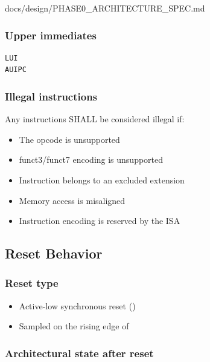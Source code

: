 \begin{relocated}{docs/design/PHASE0_ARCHITECTURE_SPEC.md}
\subsubsection{Upper immediates}\label{ds:ch:phase0-architecture:upper-immediates}

\begin{lstlisting}[language={}]
LUI
AUIPC
\end{lstlisting}

\subsubsection{Illegal instructions}\label{ds:ch:phase0-architecture:illegal-instructions}

Any instructions SHALL be considered illegal if:

\begin{itemize}
\tightlist
\item
  The opcode is unsupported
\item
  funct3/\allowbreak{}funct7 encoding is unsupported
\item
  Instruction belongs to an excluded extension
\item
  Memory access is misaligned
\item
  Instruction encoding is reserved by the ISA
\end{itemize}

\subsection{Reset Behavior}\label{ds:ch:phase0-architecture:reset-behavior}

\subsubsection{Reset type}\label{ds:ch:phase0-architecture:reset-type}

\begin{itemize}
\tightlist
\item
  Active-low synchronous reset ()
\item
  Sampled on the rising edge of 
\end{itemize}

\subsubsection{Architectural state after reset}\label{ds:ch:phase0-architecture:architectural-state-after-reset}


\end{relocated}
